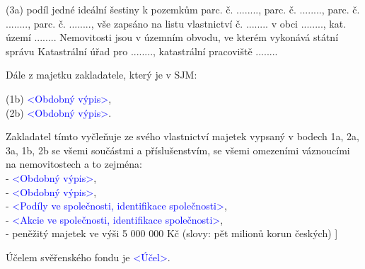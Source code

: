 \documentclass[parskip=half]{scrreprt}
\begin{document}
\begin{contract}
(3a) podíl jedné ideální šestiny k pozemkům parc. č. ........, parc. č. ........, parc. č. ........, parc. č. ........, vše zapsáno na listu vlastnictví č. ........ v obci ........, kat. území ........ Nemovitosti jsou v územním obvodu, ve kterém vykonává státní správu Katastrální úřad pro ........, katastrální pracoviště ........

Dále z majetku zakladatele, který je v SJM:

(1b) \textcolor{blue}{<Obdobný výpis>},\\
(2b) \textcolor{blue}{<Obdobný výpis>}.

Zakladatel tímto vyčleňuje ze svého vlastnictví majetek vypsaný v bodech 1a, 2a, 3a, 1b, 2b se všemi součástmi a příslušenstvím, se všemi omezeními váznoucími na nemovitostech a to zejména: \\
- \textcolor{blue}{<Obdobný výpis>},\\
- \textcolor{blue}{<Obdobný výpis>},\\
- \textcolor{blue}{<Podíly ve společnosti, identifikace společnosti>},\\
- \textcolor{blue}{<Akcie ve společnosti, identifikace společnosti>},\\
- peněžitý majetek ve výši 5 000 000 Kč (slovy: pět milionů korun českých)
]
\parnumbertrue



Účelem svěřenského fondu je \textcolor{blue}{<Účel>}.

\parnumbertrue


\end{contract}
\end{document}
